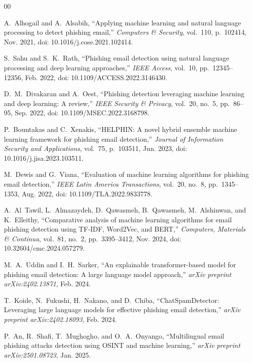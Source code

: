 \documentclass[conference]{IEEEtran}
\begin{document}
\begin{thebibliography}{00}

A.~Alhogail and A.~Alsabih, ``Applying machine learning and natural language processing to detect phishing email,'' \emph{Computers \& Security}, vol.~110, p.~102414, Nov. 2021, doi: 10.1016/j.cose.2021.102414.

S.~Sahu and S.~K.~Rath, ``Phishing email detection using natural language processing and deep learning approaches,'' \emph{IEEE Access}, vol.~10, pp.~12345--12356, Feb. 2022, doi: 10.1109/ACCESS.2022.3146430.

D.~M.~Divakaran and A.~Oest, ``Phishing detection leveraging machine learning and deep learning: A review,'' \emph{IEEE Security \& Privacy}, vol.~20, no.~5, pp.~86--95, Sep. 2022, doi: 10.1109/MSEC.2022.3168798.

P.~Bountakas and C.~Xenakis, ``HELPHIN: A novel hybrid ensemble machine learning framework for phishing email detection,'' \emph{Journal of Information Security and Applications}, vol.~75, p.~103511, Jun. 2023, doi: 10.1016/j.jisa.2023.103511.

M.~Dewis and G.~Viana, ``Evaluation of machine learning algorithms for phishing email detection,'' \emph{IEEE Latin America Transactions}, vol.~20, no.~8, pp.~1345--1353, Aug. 2022, doi: 10.1109/TLA.2022.9833778.

A.~Al~Tawil, L.~Almazaydeh, D.~Qawasmeh, B.~Qawasmeh, M.~Alshinwan, and K.~Elleithy, ``Comparative analysis of machine learning algorithms for email phishing detection using TF-IDF, Word2Vec, and BERT,'' \emph{Computers, Materials \& Continua}, vol.~81, no.~2, pp.~3395--3412, Nov. 2024, doi: 10.32604/cmc.2024.057279.

M.~A.~Uddin and I.~H.~Sarker, ``An explainable transformer-based model for phishing email detection: A large language model approach,'' \emph{arXiv preprint arXiv:2402.13871}, Feb. 2024.

T.~Koide, N.~Fukushi, H.~Nakano, and D.~Chiba, ``ChatSpamDetector: Leveraging large language models for effective phishing email detection,'' \emph{arXiv preprint arXiv:2402.18093}, Feb. 2024.

P.~An, R.~Shafi, T.~Mughogho, and O.~A.~Onyango, ``Multilingual email phishing attacks detection using OSINT and machine learning,'' \emph{arXiv preprint arXiv:2501.08723}, Jan. 2025.


\end{thebibliography}
\end{document}
